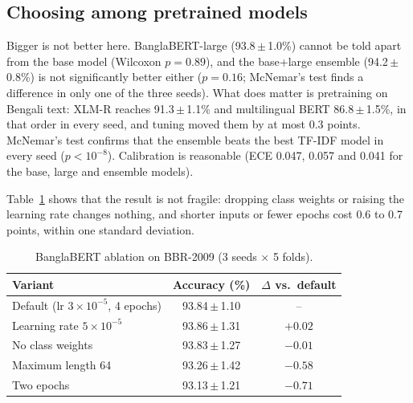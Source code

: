 \documentclass[conference,a4paper]{IEEEtran}
\newcommand{\pmstd}[2]{#1\,$\pm$\,#2}
\begin{document}
\subsection{Choosing among pretrained models}
Bigger is not better here. BanglaBERT-large (\pmstd{93.8}{1.0}\%) cannot be told apart from the base model (Wilcoxon $p=0.89$), and the base+large ensemble (\pmstd{94.2}{0.8}\%) is not significantly better either ($p=0.16$; McNemar's test finds a difference in only one of the three seeds). What does matter is pretraining on Bengali text: XLM-R reaches \pmstd{91.3}{1.1}\% and multilingual BERT \pmstd{86.8}{1.5}\%, in that order in every seed, and tuning moved them by at most 0.3 points. McNemar's test confirms that the ensemble beats the best TF-IDF model in every seed ($p<10^{-8}$). Calibration is reasonable (ECE 0.047, 0.057 and 0.041 for the base, large and ensemble models).

Table~\ref{tab:abl} shows that the result is not fragile: dropping class weights or raising the learning rate changes nothing, and shorter inputs or fewer epochs cost 0.6 to 0.7 points, within one standard deviation.

\begin{table}[t]
\centering
\caption{BanglaBERT ablation on BBR-2009 (3 seeds $\times$ 5 folds).}
\label{tab:abl}
\small
\renewcommand{\arraystretch}{1.18}
\begin{tabular}{@{}lcc@{}}
\toprule
Variant & Accuracy (\%) & $\Delta$ vs.\ default \\
\midrule
Default (lr $3{\times}10^{-5}$, 4 epochs) & \pmstd{93.84}{1.10} & -- \\
Learning rate $5{\times}10^{-5}$ & \pmstd{93.86}{1.31} & $+0.02$ \\
No class weights & \pmstd{93.83}{1.27} & $-0.01$ \\
Maximum length 64 & \pmstd{93.26}{1.42} & $-0.58$ \\
Two epochs & \pmstd{93.13}{1.21} & $-0.71$ \\
\bottomrule
\end{tabular}
\end{table}
\end{document}
